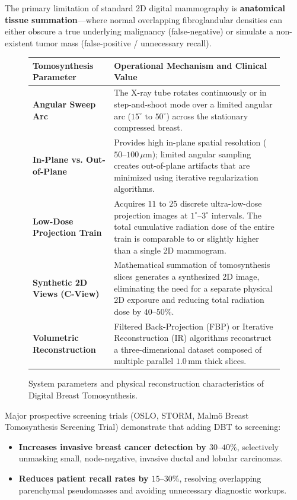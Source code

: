 \documentclass[11pt,a4paper]{article}
\begin{document}
The primary limitation of standard 2D digital mammography is \textbf{anatomical tissue summation}—where normal overlapping fibroglandular densities can either obscure a true underlying malignancy (false-negative) or simulate a non-existent tumor mass (false-positive / unnecessary recall).

\begin{figure}[htbp]
\centering
\setlength{\tabcolsep}{4pt}
\begin{tabular}{p{4.2cm}p{10.5cm}}
\toprule
\textbf{Tomosynthesis Parameter} & \textbf{Operational Mechanism and Clinical Value} \\
\midrule
\textbf{Angular Sweep Arc} & The X-ray tube rotates continuously or in step-and-shoot mode over a limited angular arc ($15^\circ\text{ to }50^\circ$) across the stationary compressed breast. \\
\addlinespace
\textbf{In-Plane vs. Out-of-Plane} & Provides high in-plane spatial resolution ($50\text{--}100\,\mu\text{m}$); limited angular sampling creates out-of-plane artifacts that are minimized using iterative regularization algorithms. \\
\addlinespace
\textbf{Low-Dose Projection Train} & Acquires $11\text{ to }25$ discrete ultra-low-dose projection images at $1^\circ\text{--}3^\circ$ intervals. The total cumulative radiation dose of the entire train is comparable to or slightly higher than a single 2D mammogram. \\
\addlinespace
\textbf{Synthetic 2D Views (C-View)} & Mathematical summation of tomosynthesis slices generates a synthesized 2D image, eliminating the need for a separate physical 2D exposure and reducing total radiation dose by $40\text{--}50\%$. \\
\addlinespace
\textbf{Volumetric Reconstruction} & Filtered Back-Projection (FBP) or Iterative Reconstruction (IR) algorithms reconstruct a three-dimensional dataset composed of multiple parallel $1.0\,\text{mm}$ thick slices. \\
\bottomrule
\end{tabular}
\caption{System parameters and physical reconstruction characteristics of Digital Breast Tomosynthesis.}
\label{tab:dbt_physics}
\end{figure}

\begin{clinicalpearl}
Major prospective screening trials (OSLO, STORM, Malmö Breast Tomosynthesis Screening Trial) demonstrate that adding DBT to screening:
\begin{itemize}[leftmargin=*]
    \item \textbf{Increases invasive breast cancer detection by $30\text{--}40\%$}, selectively unmasking small, node-negative, invasive ductal and lobular carcinomas.
    \item \textbf{Reduces patient recall rates by $15\text{--}30\%$}, resolving overlapping parenchymal pseudomasses and avoiding unnecessary diagnostic workups.
\end{itemize}
\end{clinicalpearl}
\end{document}
